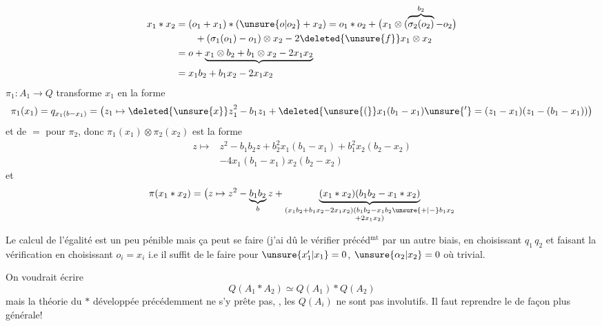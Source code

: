 \[
\begin{aligned}
x_1*x_2&=(o_1+x_1)*(\unsure{o|o_2}+x_2)
=o_1*o_2+\bigl(x_1\otimes(\overbrace{\sigma_2(o_2)}^{b_2}-o_2\bigr)\\
&\qquad+(\sigma_1(o_1)-o_1)\otimes x_2-2\deleted{\unsure{f}}x_1\otimes x_2\\
&=o+\underbrace{x_1\otimes b_2+b_1\otimes x_2-2x_1x_2}\\
&=x_1b_2+b_1x_2-2x_1x_2
\end{aligned}
\]
$\pi_1:A_1\longrightarrow Q$ transforme $x_1$ en la forme
\[
\pi_1(x_1)=q_{x_1(b-x_1)}
=\bigl(z_1\mapsto {\deleted{\unsure{x}}z}_1^2-b_1z_1+
\deleted{\unsure{(}}x_1(b_1-x_1)\unsure{'}=(z_1-x_1)(z_1-(b_1-x_1))\bigr)
\]
et de $=$ pour $\pi_2$, donc
$\pi_1(x_1)\otimes\pi_2(x_2)$ est la forme
\[
\begin{aligned}
z\longmapsto{}&z^2-b_1b_2z+b_2^2x_1(b_1-x_1)+b_1^2x_2(b_2-x_2)\\
&-4x_1(b_1-x_1)x_2(b_2-x_2)
\end{aligned}
\]
et
\[
\pi(x_1*x_2)=\bigl(z\mapsto z^2-\underbrace{b_1b_2}_{b}z+
\underbrace{(x_1*x_2)(b_1b_2-x_1*x_2)}_{\substack{(x_1b_2+b_1x_2-2x_1x_2)(b_1b_2-x_1b_2\unsure{+|-}b_1x_2\\{}+2x_1x_2)}}
\]

Le calcul de l'égalité est un peu pénible
mais ça peut se faire (j'ai dû le
vérifier précéd$^{\mathrm{mt}}$ par un autre biais,
en choisissant $q_1\,q_2$ et faisant la vérification
en choisissant $o_i=x_i$  i.e
il suffit de le faire pour $\unsure{x_1'|x_1}=0$, $\unsure{\alpha_2|x_2}=0$
où  trivial.

On voudrait écrire 
\[
Q(A_1*A_2)\simeq Q(A_1)*Q(A_2)
\]
mais la théorie du $*$ développée
précédemment ne s'y prête pas, ,
 les $Q(A_i)$ ne sont pas involutifs.
Il faut reprendre  le  
de façon plus générale!

